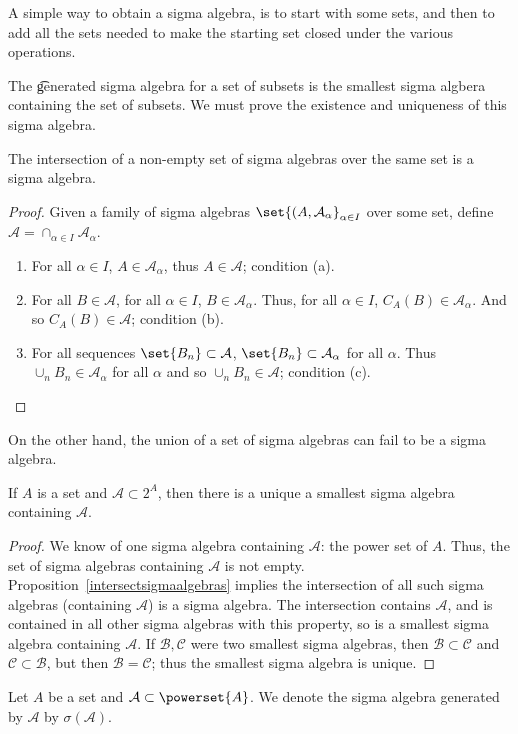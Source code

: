 

A simple way to obtain a sigma algebra, is to start with some sets, and then to add all the sets needed to make the starting set closed under the various operations.


The \t{generated sigma algebra} for a set of subsets is the smallest sigma algbera containing the set of subsets.
We must prove the existence and uniqueness of this sigma algebra.

\begin{proposition}
\label{intersectsigmaalgebras}
The intersection of a non-empty set of sigma algebras over the same set is a sigma algebra.
\begin{proof}
Given a family of sigma algebras $\set{(A, \mathcal{A} _\alpha }_{\alpha  \in I}$ over some set, define $\mathcal{A}  = \cap_{\alpha  \in I} \mathcal{A} _\alpha $.
  \begin{enumerate}
  \item For all $\alpha  \in I$, $A \in \mathcal{A} _{\alpha }$, thus $A \in \mathcal{A} $; condition (a).
  \item For all $B \in \mathcal{A} $, for all $\alpha  \in I$, $B \in \mathcal{A} _{\alpha }$.
Thus, for all $\alpha  \in I$, $C_{A}(B) \in \mathcal{A} _{\alpha }$.
And so $C_{A}(B) \in \mathcal{A} $; condition (b).
  \item For all sequences $\set{B_n} \subset \mathcal{A} $, $\set{B_n} \subset \mathcal{A} _{\alpha }$ for all $\alpha $.
Thus $\cup_{n} B_n \in \mathcal{A} _{\alpha }$ for all $\alpha $ and so $\cup_{n} B_n \in \mathcal{A} $; condition (c).
  \end{enumerate}
\end{proof}
\end{proposition}

On the other hand, the union of a set of sigma algebras can fail to be a sigma algebra.

\begin{proposition}
If $A$ is a set and $\mathcal{A}  \subset 2^A$, then there is a unique a smallest sigma algebra containing $\mathcal{A} $.

\begin{proof}
We know of one sigma algebra containing $\mathcal{A} $: the power set of $A$.
Thus, the set of sigma algebras containing $\mathcal{A} $ is not empty.
Proposition~\ref{intersectsigmaalgebras} implies the intersection of all such sigma algebras (containing $\mathcal{A} $) is a sigma algebra.
The intersection contains $\mathcal{A} $, and is contained in all other sigma algebras with this property, so is a smallest sigma algebra containing $\mathcal{A} $.
If $\mathcal{B} , \mathcal{C} $ were two smallest sigma algebras, then $\mathcal{B}  \subset \mathcal{C} $ and $\mathcal{C}  \subset \mathcal{B} $, but then $\mathcal{B}  = \mathcal{C} $; thus the smallest sigma algebra is unique.
\end{proof}
\end{proposition}


Let $A$ be a set and $\mathcal{A}  \subset \powerset{A}$.
We denote the sigma algebra generated by $\mathcal{A} $ by $\sigma (\mathcal{A} )$.
